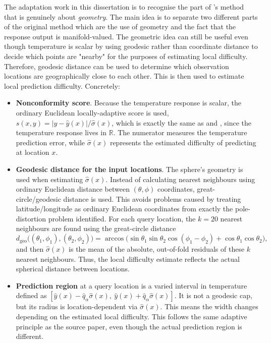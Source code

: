 \documentclass[11pt,a4paper]{report}
\newcommand{\dgeo}{d_{\mathrm{geo}}}
\begin{document}
The adaptation work in this dissertation is to recognise the part of \citet{amirishahbazi2026}'s method that is genuinely about \emph{geometry}. The main idea is to separate two different parts of the original method which are the use of geometry and the fact that the response output is manifold-valued. The geometric idea can still be useful even though temperature is scalar by using geodesic rather than coordinate distance to decide which points are "nearby" for the purposes of estimating local difficulty. Therefore, geodesic distance can be used to determine which observation locations are geographically close to each other. This is then used to estimate local prediction difficulty. Concretely:

\begin{itemize}
    \item \textbf{Nonconformity score}. Because the temperature response is scalar, the ordinary Euclidean locally-adaptive score is used, $s(x,y) = |y-\hat y(x)| / \hat\sigma(x)$, which is exactly the same as \citet{lei2018} and \citet{romano2019}, since the temperature response lives in $\mathbb{R}$. The numerator measures the temperature prediction error, while $\hat\sigma(x)$ represents the estimated difficulty of predicting at location $x$. 

    \item \textbf{Geodesic distance for the input locations}. The sphere's geometry is used when estimating $\hat\sigma(x)$. Instead of calculating nearest neighbours using ordinary Euclidean distance between $(\theta,\phi)$ coordinates, great-circle/geodesic distance is used. This avoids problems caused by treating latitude/longitude as ordinary Euclidean coordinates from exactly the pole-distortion problem \citeauthor{amirishahbazi2026} identified. For each query location, the $k=20$ nearest neighbours are found using the great-circle distance
    \begin{equation}
        \dgeo\big((\theta_1,\phi_1),(\theta_2,\phi_2)\big) = \arccos\big(\sin\theta_1\sin\theta_2\cos(\phi_1-\phi_2) + \cos\theta_1\cos\theta_2\big),
        \label{eq:geo-input}
    \end{equation}and then $\hat\sigma(x)$ is the mean of the absolute, out-of-fold residuals of these $k$ nearest neighbours. Thus, the local difficulty estimate reflects the actual spherical distance between locations. 

    \item  \textbf{Prediction region} at a query location is a varied interval in temperature defined as $[\hat y(x) - \hat q_\alpha \hat\sigma(x),\ \hat y(x) + \hat q_\alpha \hat\sigma(x)]$. It is not a geodesic cap, but its radius is location-dependent via $\hat\sigma(x)$. This means the width changes depending on the estimated local difficulty. This follows the same adaptive principle as the source paper, even though the actual prediction region is different. 
\end{itemize}
\end{document}
